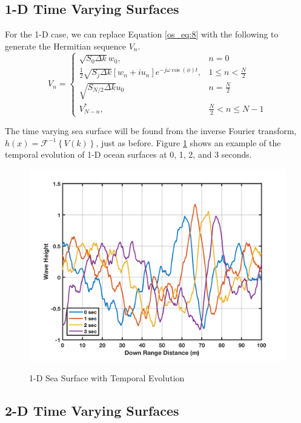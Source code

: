 \subsection{1-D Time Varying Surfaces}
For the 1-D case, we can replace Equation \ref{os_eq:8} with the following to generate the Hermitian sequence $V_n$.
\begin{equation}
  \label{os_eq:888}   
  V_n = \begin{cases}
    \sqrt{S_0\Delta k}w_0, & n = 0 \\
    \frac{1}{2}\sqrt{S_j\Delta k}\left[w_n + iu_n \right]e^{-j\omega \cos(\phi) t}, & 1 \leq n < \frac{N}{2} \\
   \sqrt{S_{N/2}\Delta k}u_0 & n = \frac{N}{2} \\
    V_{N-n}^*, &  \frac{N}{2} < n \leq N-1 
  \end{cases} 
\end{equation}

The time varying sea surface will be found from the inverse Fourier transform, $h(x) = \mathcal{F}^{-1}\left\{V(k) \right\}$, just as before. Figure \ref{os_fig:15} shows an example of the temporal evolution of 1-D ocean surfaces at 0, 1, 2, and 3 seconds.

\begin{figure}[H]
  \begin{center}
\includegraphics[width=6in]{../media/Ocean_Surface/temporal_sea_surfaces.png}
  \end{center}
  \renewcommand{\baselinestretch}{1} \small\normalsize
  \begin{quote}
    \caption[1-D Sea Surface with Temporal Evolution]{1-D Sea Surface with Temporal Evolution\label{os_fig:15}}
  \end{quote}
\end{figure}
\renewcommand{\baselinestretch}{2} \small\normalsize

\subsection{2-D Time Varying Surfaces}

